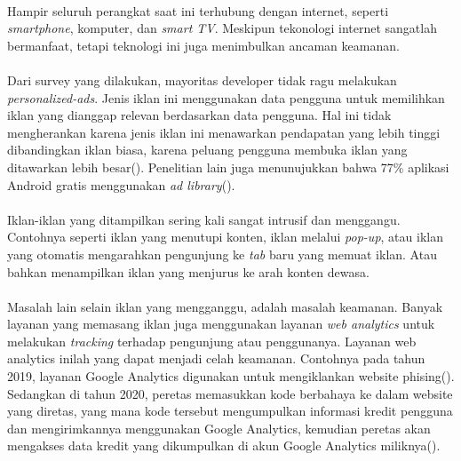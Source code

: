 \documentclass[../PROPOSAL_PRA_SKRIPSI_ALDZIKRI_DWIJAYANTO_PRATHAMA.tex]{subfiles}
\begin{document}
  \paragraph*{} Hampir seluruh perangkat saat ini terhubung
  dengan internet, seperti \textit{smartphone}, komputer,
  dan \textit{smart TV}. Meskipun tekonologi internet
  sangatlah bermanfaat, tetapi teknologi ini juga
  menimbulkan ancaman keamanan.

  \paragraph*{} Dari survey yang dilakukan, mayoritas
  developer tidak ragu melakukan \textit{personalized-ads}.
  Jenis iklan ini menggunakan data pengguna untuk memilihkan
  iklan yang dianggap relevan berdasarkan data pengguna. Hal
  ini tidak mengherankan karena jenis iklan ini menawarkan
  pendapatan yang lebih tinggi dibandingkan iklan biasa,
  karena peluang pengguna membuka iklan yang ditawarkan
  lebih besar(\cite{tahaei2021}). Penelitian lain juga
  menunujukkan bahwa 77\% aplikasi Android gratis
  menggunakan \textit{ad library}(\cite{he2018, jin2021}).

  \paragraph*{} Iklan-iklan yang ditampilkan sering kali
  sangat intrusif dan menggangu. Contohnya seperti iklan
  yang menutupi konten, iklan melalui \textit{pop-up}, atau
  iklan yang otomatis mengarahkan pengunjung ke \textit{tab}
  baru yang memuat iklan. Atau bahkan menampilkan iklan
  yang menjurus ke arah konten dewasa.

  \paragraph*{} Masalah lain selain iklan yang mengganggu,
  adalah masalah keamanan. Banyak layanan yang memasang
  iklan juga menggunakan layanan \textit{web analytics}
  untuk melakukan \textit{tracking} terhadap pengunjung atau
  penggunanya. Layanan web analytics inilah yang dapat
  menjadi celah keamanan. Contohnya pada tahun 2019, layanan
  Google Analytics digunakan untuk mengiklankan website
  phising(\cite{charlie2019}). Sedangkan di tahun 2020,
  peretas memasukkan kode berbahaya ke dalam website yang
  diretas, yang mana kode tersebut mengumpulkan informasi
  kredit pengguna dan mengirimkannya menggunakan Google
  Analytics, kemudian peretas akan mengakses data kredit
  yang dikumpulkan di akun Google Analytics
  miliknya(\cite{ravie2020}).
\end{document}
